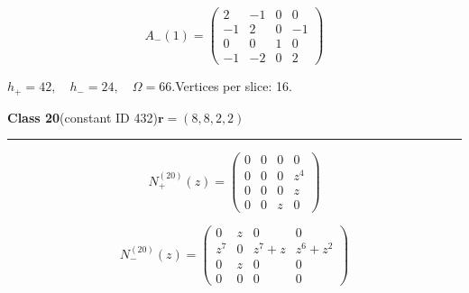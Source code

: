 \begin{minipage}{\linewidth}
\begin{minipage}[c]{0.495\linewidth}
\setlength{\abovedisplayshortskip}{4pt}\setlength{\belowdisplayshortskip}{4pt}
\setlength{\arraycolsep}{3pt}\renewcommand{\arraystretch}{1.08}
\[A_{-}(1)=\begin{pmatrix}2 & -1 & 0 & 0\\-1 & 2 & 0 & -1\\0 & 0 & 1 & 0\\-1 & -2 & 0 & 2\end{pmatrix}\]
\end{minipage}%
\par\smallskip\noindent\small $h_+=42,\quad h_-=24,\quad \Omega=66.$\quad Vertices per slice: 16.
\end{minipage}\par\vfill
\noindent\begin{minipage}{\linewidth}
\noindent\textbf{Class 20}\quad\small (constant ID 432)\hfill $\symbf{r}=(8,8,2,2)$
\par\smallskip\noindent\textcolor{rulegray}{\rule{\linewidth}{0.3pt}}
\begin{minipage}[c]{0.495\linewidth}\centering\fontsize{9.7}{12}\selectfont
\setlength{\abovedisplayskip}{4pt}\setlength{\belowdisplayskip}{4pt}
\setlength{\abovedisplayshortskip}{4pt}\setlength{\belowdisplayshortskip}{4pt}
\setlength{\arraycolsep}{3pt}\renewcommand{\arraystretch}{1.08}
\[N_{+}^{(20)}(z)=\begin{pmatrix}0 & 0 & 0 & 0\\0 & 0 & 0 & z^{4}\\0 & 0 & 0 & z\\0 & 0 & z & 0\end{pmatrix}\]
\end{minipage}%
\begin{minipage}[c]{0.495\linewidth}\centering\fontsize{9.7}{12}\selectfont
\setlength{\abovedisplayskip}{4pt}\setlength{\belowdisplayskip}{4pt}
\setlength{\abovedisplayshortskip}{4pt}\setlength{\belowdisplayshortskip}{4pt}
\setlength{\arraycolsep}{3pt}\renewcommand{\arraystretch}{1.08}
\[N_{-}^{(20)}(z)=\begin{pmatrix}0 & z & 0 & 0\\z^{7} & 0 & z^{7} + z & z^{6} + z^{2}\\0 & z & 0 & 0\\0 & 0 & 0 & 0\end{pmatrix}\]
\end{minipage}%
\par\noindent
\begin{minipage}[c]{0.495\linewidth}\centering\fontsize{9.7}{12}\selectfont
\setlength{\abovedisplayskip}{4pt}\setlength{\belowdisplayskip}{4pt}

\end{minipage}
\end{minipage}
